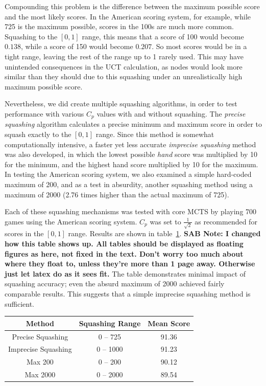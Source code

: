 \documentclass[letterpaper]{article}
\begin{document}
Compounding this problem is the difference between the maximum possible score and the most likely scores. In the American scoring system, for example, while 725 is the maximum possible, scores in the 100s are much more common. Squashing to the $[0,1]$ range, this means that a score of 100 would become $0.138$, while a score of 150 would become $0.207$. So most scores would be in a tight range, leaving the rest of the range up to 1 rarely used. This may have unintended consequences in the UCT calculation, as nodes would look more similar than they should due to this squashing under an unrealistically high maximum possible score.

Nevertheless, we did create multiple squashing algorithms, in order to test performance with various $C_p$ values with and without squashing. The {\it precise squashing} algorithm calculates a precise minimum and maximum score in order to squash exactly to the $[0,1]$ range. Since this method is somewhat computationally intensive, a faster yet less accurate {\it imprecise squashing} method was also developed, in which the lowest possible {\it hand} score was multiplied by 10 for the minimum, and the highest hand score multiplied by 10 for the maximum. In testing the American scoring system, we also examined a simple hard-coded maximum of 200, and as a test in absurdity, another squashing method using a maximum of 2000 (2.76 times higher than the actual maximum of 725).

Each of these squashing mechanisms was tested with core MCTS by playing 700 games using the American scoring system. $C_p$ was set to $\frac{1}{\sqrt{2}}$ as recommended for scores in the $[0,1]$ range. Results are shown in table~\ref{tbl:Squashing}. {\bf SAB Note: I changed how this table shows up. All tables should be displayed as floating figures as here, not fixed in the text. Don't worry too much about where they float to, unless they're more than 1 page away. Otherwise just let latex do as it sees fit.} The table demonstrates minimal impact of squashing accuracy; even the absurd maximum of 2000 achieved fairly comparable results. This suggests that a simple imprecise squashing method is sufficient.

\begin{table}
\label{tbl:Squashing}
\centering
\begin{tabular}{c c c}
\hline
Method & Squashing Range & Mean Score \\
\hline
Precise Squashing & 0 -- 725 & 91.36 \\
Imprecise Squashing & 0 -- 1000 & 91.23 \\
Max 200 & 0 -- 200 & 90.12 \\
Max 2000 & 0 -- 2000 & 89.54 \\
\hline
\end{tabular}
\end{table}
\end{document}
